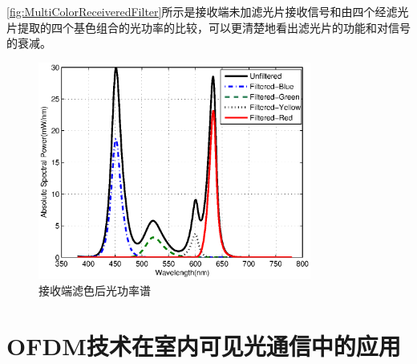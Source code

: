 \autoref{fig:MultiColorReceiveredFilter}所示是接收端未加滤光片接收信号和由四个经滤光片提取的四个基色组合的光功率的比较，可以更清楚地看出滤光片的功能和对信号的衰减。
\begin{figure}[htbp]
    \centering
    \includegraphics[width=0.8\textwidth]{figures/chapter-2/MultiColorReceiveredFilter.eps}
    \caption{接收端滤色后光功率谱}
    \label{fig:MultiColorReceiveredFilter}
\end{figure}
\section{OFDM技术在室内可见光通信中的应用}
